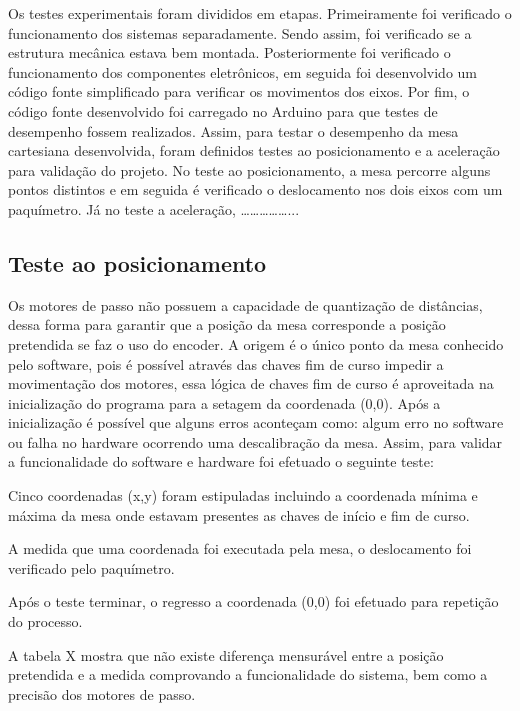 Os testes experimentais foram divididos em etapas. Primeiramente foi verificado o funcionamento dos sistemas 
separadamente. Sendo assim, foi verificado se a estrutura mecânica estava bem montada. Posteriormente foi verificado 
o funcionamento dos componentes eletrônicos, em seguida foi desenvolvido um código fonte simplificado para verificar 
os movimentos dos eixos. Por fim, o código fonte desenvolvido foi carregado no Arduino para que testes de desempenho 
fossem realizados.
Assim, para testar o desempenho da mesa cartesiana desenvolvida, foram definidos testes ao posicionamento e a 
aceleração para validação do projeto. No teste ao posicionamento, a mesa percorre alguns pontos distintos e em 
seguida é verificado o deslocamento nos dois eixos com um paquímetro. Já no teste a aceleração, ……………...

\subsection{Teste ao posicionamento}

Os motores de passo não possuem a capacidade de quantização de distâncias, dessa forma para garantir que a
posição da mesa corresponde a posição pretendida se faz o uso do encoder.
A origem é o único ponto da mesa conhecido pelo software, pois é possível através das chaves 
fim de curso impedir a movimentação dos motores, essa lógica de chaves fim de curso é aproveitada 
na inicialização do programa para a setagem da coordenada (0,0). Após a inicialização é possível que 
alguns erros aconteçam como: algum erro no software ou falha no hardware ocorrendo uma descalibração da mesa.
Assim, para validar a funcionalidade do software e hardware foi efetuado o seguinte teste:

\begin{alineas}
    \item Cinco coordenadas (x,y) foram estipuladas incluindo a coordenada mínima e máxima da mesa onde estavam 
    presentes as chaves de início e fim de curso.
    \item A medida que uma coordenada foi executada pela mesa, o deslocamento foi verificado pelo paquímetro.
    \item Após o teste terminar, o regresso a coordenada (0,0) foi efetuado para repetição do processo.
\end{alineas}


A tabela X mostra que não existe diferença mensurável entre a posição pretendida e a medida comprovando 
a funcionalidade do sistema, bem como a precisão dos motores de passo.

